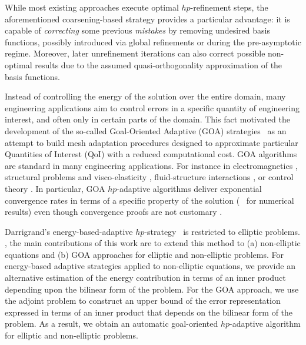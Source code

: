 While most existing approaches execute optimal $hp$-refinement steps, the aforementioned coarsening-based strategy provides a particular advantage: it is capable of \emph{correcting} some previous \emph{mistakes} by removing undesired basis functions, possibly introduced via global refinements or during the pre-asymptotic regime. Moreover, later unrefinement iterations can also correct possible non-optimal results due to the assumed quasi-orthogonality approximation of the basis functions.

Instead of controlling the energy of the solution over the entire domain, many engineering applications aim to control errors in a specific quantity of engineering interest, and often only in certain parts of the domain. This fact motivated the development of the so-called Goal-Oriented Adaptive (GOA) strategies~\cite{becker1996weighted,rannacher1998posteriori, prudhomme1999goal,oden2001goal} as an attempt to build mesh adaptation procedures designed to approximate particular Quantities of Interest (QoI) with a reduced computational cost. GOA algorithms are standard in many engineering applications. For instance in electromagnetics \cite{pardo2006goal, pardo2007self, pardo2010multigoal, alvarez2017dimensionally}, structural problems and visco-elasticity \cite{panetier2010strict,waeytens2012guaranteed,verdugo2012computable}, fluid-structure interactions \cite{van2011goal1,van2011goal2,van2011isogeometric,wick2012goal}, or control theory \cite{hintermuller2010goal,gunther2012posteriori,hintermuller2014dual}. In particular, GOA $hp$-adaptive algorithms deliver exponential convergence rates in terms of a specific property of the solution (~\cite{darrigrand2015goal,holst2015convergence,darrigrand2018goal,holstpollock2016,valseth2020goal} for numerical results) even though convergence proofs are not customary \cite{rachowicz2006fully}.



Darrigrand's energy-based-adaptive $hp$-strategy~\cite{darrigrand2020painless} is restricted to elliptic problems. , the main contributions of this work are to extend this method to (a) non-elliptic equations and (b) GOA approaches for elliptic and non-elliptic problems. For energy-based adaptive strategies applied to non-elliptic equations, we provide an alternative estimation of the energy contribution in terms of an inner product depending upon the bilinear form of the problem. For the GOA approach, we use the adjoint problem to construct an upper bound of the error representation expressed in terms of an inner product that depends on the bilinear form of the problem. As a result, we obtain an automatic goal-oriented $hp$-adaptive algorithm for elliptic and non-elliptic problems.

